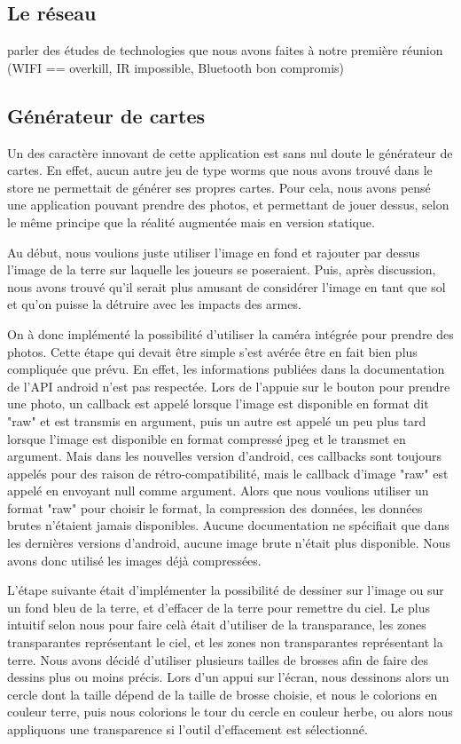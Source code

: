\documentclass{report}
\begin{document}
\subsection{Le réseau}

parler des études de technologies que nous avons faites à notre première réunion
(WIFI == overkill, IR impossible, Bluetooth bon compromis)

\subsection{Générateur de cartes}

Un des caractère innovant de cette application est sans nul doute le
générateur de cartes.
En effet, aucun autre jeu de type worms que nous avons trouvé dans le
store ne permettait de générer ses propres cartes. Pour cela, nous avons
pensé une application pouvant prendre des photos, et permettant de jouer
dessus, selon le même principe que la réalité augmentée mais en version
statique.

Au début, nous voulions juste utiliser l'image en fond et rajouter
par dessus l'image de la terre sur laquelle les joueurs se poseraient.
Puis, après discussion, nous avons trouvé qu'il serait plus amusant
de considérer l'image en tant que sol et qu'on puisse la détruire avec
les impacts des armes.

On à donc implémenté la possibilité d'utiliser la caméra intégrée pour prendre des photos.
Cette étape qui devait être simple s'est avérée être en fait bien plus compliquée que prévu.
En effet, les informations publiées dans la documentation de l'API android
n'est pas respectée. Lors de l'appuie sur le bouton pour prendre une photo,
un callback est appelé lorsque l'image est disponible en format dit "raw" et
est transmis en argument,
puis un autre est appelé un peu plus tard lorsque l'image est disponible en
format compressé jpeg et le transmet en argument. Mais dans les nouvelles version d'android, ces callbacks
sont toujours appelés pour des raison de rétro-compatibilité, mais le callback
d'image "raw" est appelé en envoyant null comme argument. Alors que nous voulions
utiliser un format "raw" pour choisir le format, la compression des données,
les données brutes n'étaient jamais disponibles. Aucune documentation
ne spécifiait que dans les dernières versions d'android, aucune image
brute n'était plus disponible. Nous avons donc utilisé les images déjà
compressées.

L'étape suivante était d'implémenter la possibilité de dessiner sur l'image
ou sur un fond bleu de la terre, et d'effacer de la terre pour remettre du ciel.
Le plus intuitif selon nous pour faire celà était d'utiliser de la transparance,
les zones transparantes représentant le ciel, et les zones non transparantes
représentant la terre. Nous avons décidé d'utiliser plusieurs tailles
de brosses afin de faire des dessins plus ou moins précis. Lors d’un appui sur l’écran, nous dessinons alors un cercle dont la taille dépend de la taille de brosse choisie, et nous le colorions en couleur terre, puis nous colorions le tour du cercle en couleur herbe, ou alors nous appliquons une transparence si l’outil d’effacement est sélectionné.
\end{document}
